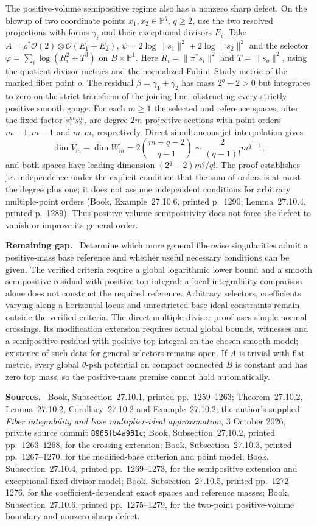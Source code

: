 \documentclass[11pt]{article}
\newcommand{\field}[1]{\par\medskip\noindent\textbf{#1.}\ }
\begin{document}
The positive-volume semipositive regime also has a nonzero sharp defect. On the blowup of two coordinate points $x_1,x_2\in\mathbb P^q$, $q\geq2$, use the two resolved projections with forms $\gamma_i$ and their exceptional divisors $E_i$. Take $A=\rho^*\mathcal O(2)\otimes\mathcal O(E_1+E_2)$, $\psi=2\log\|s_1\|^2+2\log\|s_2\|^2$ and the selector $\varphi=\sum_i\log(R_i^2+T^3)$ on $B\times\mathbb P^1$. Here $R_i=\|\pi^*s_i\|^2$ and $T=\|s_o\|^2$, using the quotient divisor metrics and the normalized Fubini--Study metric of the marked fiber point $o$. The residual $\beta=\gamma_1+\gamma_2$ has mass $2^q-2>0$ but integrates to zero on the strict transform of the joining line, obstructing every strictly positive smooth gauge. For each $m\geq1$ the selected and reference spaces, after the fixed factor $s_1^ms_2^m$, are degree-$2m$ projective sections with point orders $m-1,m-1$ and $m,m$, respectively. Direct simultaneous-jet interpolation gives
\[
 \dim V_m-\dim W_m=2\binom{m+q-2}{q-1}
 \sim\frac{2}{(q-1)!}m^{q-1},
\]
and both spaces have leading dimension $(2^q-2)m^q/q!$. The proof establishes jet independence under the explicit condition that the sum of orders is at most the degree plus one; it does not assume independent conditions for arbitrary multiple-point orders (Book, Example~27.10.6, printed p.~1290; Lemma~27.10.4, printed p.~1289). Thus positive-volume semipositivity does not force the defect to vanish or improve its general order.

\field{Remaining gap} Determine which more general fiberwise singularities admit a positive-mass base reference and whether useful necessary conditions can be given. The verified criteria require a global logarithmic lower bound and a smooth semipositive residual with positive top integral; a local integrability comparison alone does not construct the required reference. Arbitrary selectors, coefficients varying along a horizontal locus and unrestricted base ideal constraints remain outside the verified criteria. The direct multiple-divisor proof uses simple normal crossings. Its modification extension requires actual global bounds, witnesses and a semipositive residual with positive top integral on the chosen smooth model; existence of such data for general selectors remains open. If $A$ is trivial with flat metric, every global $\theta$-psh potential on compact connected $B$ is constant and has zero top mass, so the positive-mass premise cannot hold automatically.
\field{Sources} Book, Subsection~27.10.1, printed pp.~1259--1263; Theorem~27.10.2, Lemma~27.10.2, Corollary~27.10.2 and Example~27.10.2; the author's supplied \emph{Fiber integrability and base multiplier-ideal approximation}, 3 October 2026, private source commit \texttt{8965fb4a931c}; Book, Subsection~27.10.2, printed pp.~1263--1268, for the crossing extension; Book, Subsection~27.10.3, printed pp.~1267--1270, for the modified-base criterion and point model; Book, Subsection~27.10.4, printed pp.~1269--1273, for the semipositive extension and exceptional fixed-divisor model; Book, Subsection~27.10.5, printed pp.~1272--1276, for the coefficient-dependent exact spaces and reference masses; Book, Subsection~27.10.6, printed pp.~1275--1279, for the two-point positive-volume boundary and nonzero sharp defect.
\end{document}
